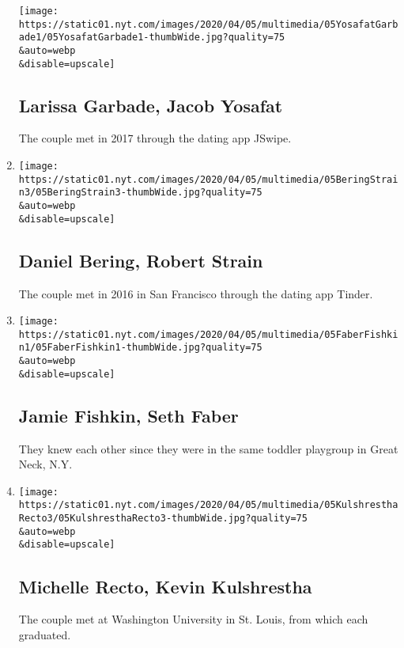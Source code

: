 \begin{enumerate}
  \texttt{[image: https://static01.nyt.com/images/2020/04/05/multimedia/05YosafatGarbade1/05YosafatGarbade1-thumbWide.jpg?quality=75\\\&auto=webp\\\&disable=upscale]}

  \hypertarget{larissa-garbade-jacob-yosafat}{%
  \subsection{Larissa Garbade, Jacob
  Yosafat}\label{larissa-garbade-jacob-yosafat}}

  The couple met in 2017 through the dating app JSwipe.
\item
  \href{/2020/04/05/fashion/weddings/daniel-bering-robert-strain.html}{}

  \texttt{[image: https://static01.nyt.com/images/2020/04/05/multimedia/05BeringStrain3/05BeringStrain3-thumbWide.jpg?quality=75\\\&auto=webp\\\&disable=upscale]}

  \hypertarget{daniel-bering-robert-strain}{%
  \subsection{Daniel Bering, Robert
  Strain}\label{daniel-bering-robert-strain}}

  The couple met in 2016 in San Francisco through the dating app Tinder.
\item
  \href{/2020/04/05/fashion/weddings/jamie-fishkin-seth-faber.html}{}

  \texttt{[image: https://static01.nyt.com/images/2020/04/05/multimedia/05FaberFishkin1/05FaberFishkin1-thumbWide.jpg?quality=75\\\&auto=webp\\\&disable=upscale]}

  \hypertarget{jamie-fishkin-seth-faber}{%
  \subsection{Jamie Fishkin, Seth
  Faber}\label{jamie-fishkin-seth-faber}}

  They knew each other since they were in the same toddler playgroup in
  Great Neck, N.Y.
\item
  \href{/2020/04/05/fashion/weddings/michelle-recto-kevin-kulshrestha.html}{}

  \texttt{[image: https://static01.nyt.com/images/2020/04/05/multimedia/05KulshresthaRecto3/05KulshresthaRecto3-thumbWide.jpg?quality=75\\\&auto=webp\\\&disable=upscale]}

  \hypertarget{michelle-recto-kevin-kulshrestha}{%
  \subsection{Michelle Recto, Kevin
  Kulshrestha}\label{michelle-recto-kevin-kulshrestha}}

  The couple met at Washington University in St. Louis, from which each
  graduated.
\end{enumerate}

